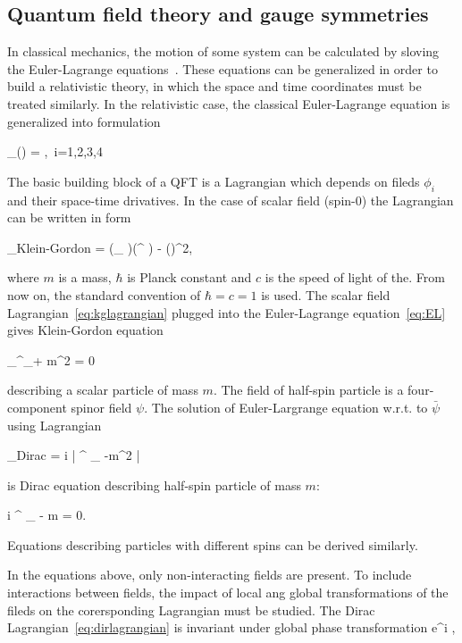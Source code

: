 \subsection{Quantum field theory and gauge symmetries}

In classical mechanics, the motion of some system can be calculated by sloving the Euler-Lagrange equations~\cite{9783527411887}. These equations can be generalized in order to build a relativistic theory, in which the space and time coordinates must be treated similarly. In the relativistic case, the classical Euler-Lagrange equation is generalized into formulation

{
 \partial_{\mu}() = ,~i=1,2,3,4
}


The basic building block of a QFT is a Lagrangian which depends on fileds $\phi_{i}$ and  their space-time drivatives. In the case of scalar field (spin-0) the Lagrangian can be written in form 

{
 _{Klein-Gordon} = (\partial_{\mu} \phi)(\partial^{\mu} \phi) -  ()^{2},
}

where $m$ is a mass, $\hbar$ is Planck constant and $c$ is the speed of light of the. From now on, the standard convention of $\hbar = c = 1$ is used. The scalar field Lagrangian~\ref{eq:kglagrangian} plugged into the Euler-Lagrange equation~\ref{eq:EL} gives Klein-Gordon equation

{
 \partial_{\mu}\partial^{\mu}_\phi + m^{2} \phi = 0
}

describing a scalar particle of mass $m$. The field of half-spin particle is a four-component spinor field $\psi$. The solution of Euler-Largrange equation w.r.t. to $\bar{\psi}$ using Lagrangian


{
 _{Dirac} = i \bar{\psi} \gamma^{\mu} \partial_{\mu} \psi -m^{2} \bar{\psi} \psi
}

is Dirac equation describing half-spin particle of mass $m$:

{
  i \gamma^{\mu} \partial_{\mu} \psi - m \psi = 0.
}

Equations describing  particles with different spins can be derived similarly.

In the equations above, only non-interacting fields are present. To include interactions between fields, the impact of local ang global transformations of the fileds on the corersponding Lagrangian must be studied.  The Dirac Lagrangian~\ref{eq:dirlagrangian} is invariant under global phase transformation
{
\psi \to e^{i\theta} \psi, 
}

